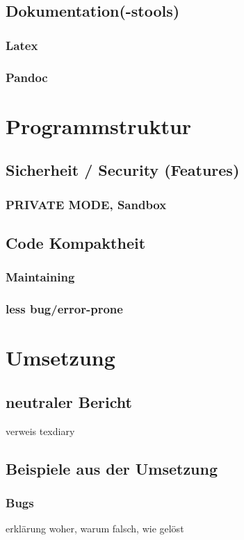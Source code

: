 \documentclass[a4paper,11pt]{article}
\begin{document}
\subsection{Dokumentation(-stools)}
\subsubsection{Latex}
\subsubsection{Pandoc}

\section{Programmstruktur}

\subsection{Sicherheit / Security (Features)}
\subsubsection{PRIVATE MODE, Sandbox}

\subsection{Code Kompaktheit}
\subsubsection{Maintaining}
\subsubsection{less bug/error-prone}

\section{Umsetzung}

\subsection{neutraler Bericht}
verweis texdiary
\subsection{Beispiele aus der Umsetzung}
\subsubsection{Bugs}
erklärung woher, warum falsch, wie gelöst
\end{document}
